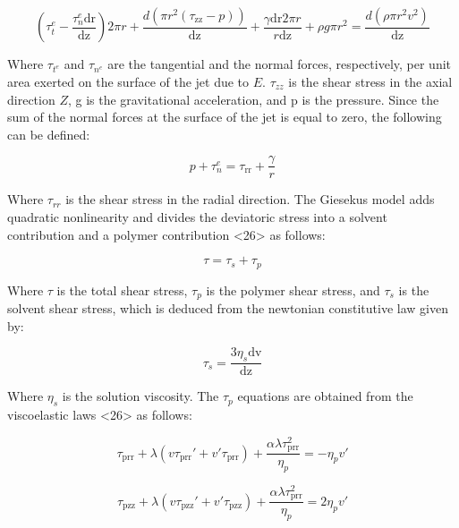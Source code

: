\begin{equation}
\left(\tau _t^e-\frac{\tau _n^e \text{dr}}{\text{dz}}\right) 2 \pi  r+\frac{d \left(\pi  r^2
   \left(\tau _{\text{zz}}-p\right)\right)}{\text{dz}}+\frac{\gamma  \text{dr} 2 \pi  r}{r
   \text{dz}}+\rho  g \pi  r^2=\frac{d \left(\rho  \pi  r^2 v^2\right)}{\text{dz}}
\label{eq:linearMomentum}
\end{equation}

Where $\tau_{t^e}$ and $\tau_{n^e}$ are the tangential and the normal forces, respectively, per unit area exerted on the surface of the jet due to $E$. $\tau_{zz}$ is the shear stress in the axial direction $Z$, g is the gravitational acceleration, and p is the pressure. Since the sum of the normal forces at the surface of the jet is equal to zero, the following can be defined:

\begin{equation}
p+\tau _n^e=\tau _{\text{rr}}+\frac{\gamma }{r}
\label{eq:sumNormalForces}
\end{equation}

Where $\tau_{rr}$ is the shear stress in the radial direction. The Giesekus model adds quadratic nonlinearity and divides the deviatoric stress into a solvent contribution and a polymer contribution <26> as follows:

\begin{equation}
\tau =\tau _s+\tau _p
\label{eq:shearStress}
\end{equation}

Where $\tau$ is the total shear stress, $\tau_{p}$ is the polymer shear stress, and $\tau_{s}$ is the solvent shear stress, which is deduced from the newtonian constitutive law given by:

\begin{equation}
\tau _s=\frac{3 \eta _s \text{dv}}{\text{dz}}
\label{eq:solventShearStress}
\end{equation}

Where $\eta_{s}$ is the solution viscosity. The $\tau_{p}$ equations are obtained from the viscoelastic laws <26> as follows:

\begin{equation}
\tau _{\text{prr}}+\lambda  \left(v \tau _{\text{prr}}'+v' \tau
   _{\text{prr}}\right)+\frac{\alpha  \lambda  \tau _{\text{prr}}^2}{\eta _p}=-\eta _p v'
\label{eq:polymer1ShearStress}
\end{equation}

\begin{equation}
\tau _{\text{pzz}}+\lambda  \left(v \tau _{\text{pzz}}'+v' \tau
   _{\text{pzz}}\right)+\frac{\alpha  \lambda  \tau _{\text{prr}}^2}{\eta _p}=2 \eta _p v'
\label{eq:polymer2ShearStress}
\end{equation}

